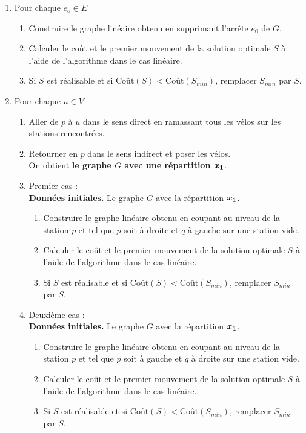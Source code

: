 \begin{enumerate}
\item \underline{Pour chaque $e_o \in E$}
  \begin{enumerate}
  \item Construire le graphe linéaire obtenu en supprimant l'arrête $e_0$ de $G$.
  \item Calculer le coût et le premier mouvement de la solution optimale $S$ à l'aide de l'algorithme dans le cas linéaire.
  \item Si $S$ est réalisable et si $\mbox{Coût}(S) < \mbox{Coût}(S_{min})$, remplacer $S_{min}$ par $S$.
  \end{enumerate}
\item \underline{Pour chaque $u \in V$}
  \begin{enumerate}
  \item Aller de $p$ à $u$ dans le sens direct en ramassant tous les vélos sur les stations rencontrées.
  \item Retourner en $p$ dans le sens indirect et poser les vélos.\\
    On obtient \textbf{le graphe $G$ avec une répartition $\boldsymbol{x_1}$}.
  \item \underline{Premier cas :}\\
    \textbf{Données initiales.} Le graphe $G$ avec la répartition $\boldsymbol{x_1}$.
    \begin{enumerate}
    \item Construire le graphe linéaire obtenu en coupant au niveau de la station $p$ et tel que $p$ soit à droite et $q$ à gauche sur une station vide.
    \item Calculer le coût et le premier mouvement de la solution optimale $S$ à l'aide de l'algorithme dans le cas linéaire.
    \item Si $S$ est réalisable et si $\mbox{Coût}(S) < \mbox{Coût}(S_{min})$, remplacer $S_{min}$ par $S$.
    \end{enumerate}
  \item \underline{Deuxième cas :}\\
    \textbf{Données initiales.} Le graphe $G$ avec la répartition $\boldsymbol{x_1}$.
    \begin{enumerate}
    \item Construire le graphe linéaire obtenu en coupant au niveau de la station $p$ et tel que $p$ soit à gauche et $q$ à droite sur une station vide.
    \item Calculer le coût et le premier mouvement de la solution optimale $S$ à l'aide de l'algorithme dans le cas linéaire.
    \item Si $S$ est réalisable et si $\mbox{Coût}(S) < \mbox{Coût}(S_{min})$, remplacer $S_{min}$ par $S$.
    \end{enumerate}
  \end{enumerate}
\end{enumerate}

